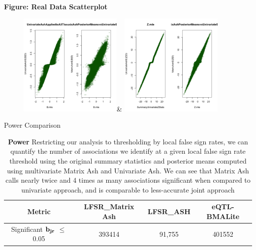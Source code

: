 \textbf{Figure: Real Data Scatterplot}
\begin{figure}[htbp]
\includegraphics[width=5cm]{Figures/comparebeta.png}&
\includegraphics[width=5cm]{Figures/comparez.png}\\
\end{figure}\newline

\begin{table}[ht]
\caption{Power Comparison}
\centering
\begin{tabular}{c c c c}
\hline\hline
Metric & LFSR_{Matrix Ash} & LFSR_{ASH}&eQTL-BMALite \\ [0.5ex] %
\hline
Significant $\bf{b}_{jr}$ $\leq$ 0.05%
&393414 & 91,755&401552\\
\hline
\end{tabular}
\label{table:power}\newline
\caption{\textbf{Power} Restricting our analysis to thresholding by local false sign rates, we can quantify the number of associations we identify at a given local false sign rate threshold using the original summary statistics and posterior means computed using multivariate Matrix Ash and Univariate Ash. We can see that Matrix Ash calls nearly twice and 4 times as many associations significant when compared to univariate approach, and is comparable to less-accurate joint approach}
\end{table}\newline

